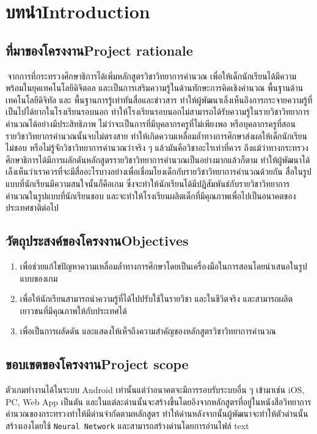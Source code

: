 \chapter{\ifcpe บทนำ\else Introduction\fi}

\section{\ifcpe ที่มาของโครงงาน\else Project rationale\fi}
$\>$จากการที่กระทรวงศึกษาธิการได้เพิ่มหลักสูตรวิชาวิทยาการคำนวณ\cite{cpc} 
เพื่อให้เด็กนักเรียนได้มีความพร้อมในยุคเทคโนโลยีดิจิตอล 
และเป็นการเสริมความรู้ในด้านทักษะการคิดเชิงคำนวณ 
พื้นฐานด้านเทคโนโลยีดิจิทัล และ พื้นฐานการรู้เท่าทันสื่อและข่าวสาร 
ทำให้ผู้พัฒนาเล็งเห็นถึงการกระจายความรู้ที่เป็นไปได้ยากในโรงเรียนรอบนอก 
ทำให้โรงเรียนรอบนอกไม่สามารถได้รับความรู้ในรายวิชาวิทยาการคำนวณได้อย่างมีประสิทธิภาพ 
ไม่ว่าจะเป็นการที่มีบุคลากรครูที่ไม่เพียงพอ หรือบุคลากรครูที่สอนรายวิชาวิทยากรคำนวณนั้นจบไม่ตรงสาย 
ทำให้เกิดความเหลื่อมล้ำทางการศึกษาส่งผลให้เด็กนักเรียนไม่ชอบ หรือไม่รู้จักวิชาวิทยาการคำนวณว่าจริง ๆ 
แล้วมันคือวิชาอะไรเท่าที่ควร ถึงแม้ว่าทางกระทรวงศึกษาธิการได้มีการผลักดันหลักสูตรรายวิชาวิทยาการคำนวณเป็นอย่างมากแล้วก็ตาม
ทำให้ผู้พัฒนาได้เล็งเห็นว่าเราควรที่จะมีสื่ออะไรบางอย่างเพื่อเชื่อมโยงเด็กกับรายวิชาวิทยาการคำนวณด้วยกัน 
สื่อในรูปแบบที่นักเรียนมีความสนใจนั้นก็คือเกม ซึ่งจะทำให้นักเรียนได้มีปฏิสัมพันธ์กับรายวิชาวิทยาการคำนวณในรูปแบบที่นักเรียนชอบ 
และจะทำให้โรงเรียนผลิตเด็กที่มีคุณภาพเพื่อไปเป็นอนาคตของประเทศชาติต่อไป
\section{\ifcpe วัตถุประสงค์ของโครงงาน\else Objectives\fi}
\begin{enumerate}
    \item เพื่อช่วยแก้ไขปัญหาความเหลื่อมล้ำทางการศึกษาโดยเป็นเครื่องมือในการสอนโดยนำเสนอในรูปแบบของเกม
    \item เพื่อให้นักเรียนสามารถนำความรู้ที่ได้ไปปรับใช้ในรายวิชา และในชีวิตจริง และสามารถผลิตเยาวชนที่มีคุณภาพให้กับประเทศได้
    \item เพื่อเป็นการผลัดดัน และแสดงให้เห็ฯถึงความสำคัญของหลักสูตรวิชาวิทยาการคำนวณ
\end{enumerate}

\section{\ifcpe ขอบเขตของโครงงาน\else Project scope\fi}
ตัวเกมทำงานได้ในระบบ Android เท่านั้นแต่ว่าอนาคตจะมีการรอบรับระบบอื่น ๆ 
เข้ามาเช่น iOS, PC, Web App เป็นตัน 
และในแต่ละด่านนั้นจะสร้างขึ้นโดยอิงจากหลักสูตรที่อยู่ในหนังสือวิทยาการคำนวณของกระทรวงทำให้มีด่านจำกัดตามหลักสูตร 
ทำให้ด่านหลังจากนั้นผู้พัฒนาจะทำให้ตัวด่านนั้นสร้างเองโดยใช้ \texttt{Neural Network} และสามารถสร้างด่านโดยการอ่านไฟล์ text
